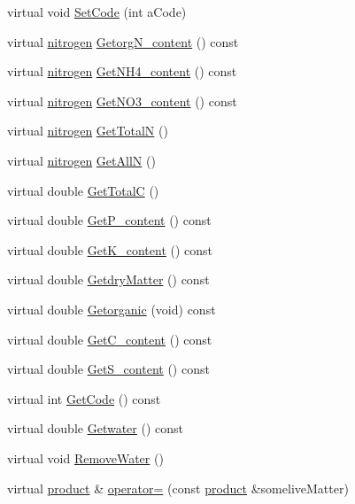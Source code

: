 \begin{DoxyCompactItemize}
\item 
virtual void \hyperlink{classlive_matter_adccc136d61343a2fa73a7ed5aafbed3e}{SetCode} (int aCode)
\item 
virtual \hyperlink{classnitrogen}{nitrogen} \hyperlink{classlive_matter_ac4b95fdff5ad224d9aa1541589c64663}{GetorgN\_\-content} () const 
\item 
virtual \hyperlink{classnitrogen}{nitrogen} \hyperlink{classlive_matter_a461f95ec9e31447ffee31066ea357ab1}{GetNH4\_\-content} () const 
\item 
virtual \hyperlink{classnitrogen}{nitrogen} \hyperlink{classlive_matter_ab2a2d0d05066ad642643b8835016010e}{GetNO3\_\-content} () const 
\item 
virtual \hyperlink{classnitrogen}{nitrogen} \hyperlink{classlive_matter_a1688ff189b2809aeefd3b25b74f8446d}{GetTotalN} ()
\item 
virtual \hyperlink{classnitrogen}{nitrogen} \hyperlink{classlive_matter_ac2063bf6ed8da618b7b2b2b47defaa12}{GetAllN} ()
\item 
virtual double \hyperlink{classlive_matter_a62259dba6b54a8d4d8684cbe9bf312ce}{GetTotalC} ()
\item 
virtual double \hyperlink{classlive_matter_aed9acd0807e62d97e092ea6c2aaa966f}{GetP\_\-content} () const 
\item 
virtual double \hyperlink{classlive_matter_accdc895062d3dbebf1277b565b1b72d3}{GetK\_\-content} () const 
\item 
virtual double \hyperlink{classlive_matter_ad3d05f1e8ceedc99e214adca94638de0}{GetdryMatter} () const 
\item 
virtual double \hyperlink{classlive_matter_a7b016854c1d3b40807216315b031263a}{Getorganic} (void) const 
\item 
virtual double \hyperlink{classlive_matter_a899102ff3dccbfdc70b79e701c135514}{GetC\_\-content} () const 
\item 
virtual double \hyperlink{classlive_matter_a1006a296abc6361ae90010ff27ff8281}{GetS\_\-content} () const 
\item 
virtual int \hyperlink{classlive_matter_afd7dcfed0138fc12d81d29aa586c5c73}{GetCode} () const 
\item 
virtual double \hyperlink{classlive_matter_a6a4839f1bc9ee6db69b25a7a66151f26}{Getwater} () const 
\item 
virtual void \hyperlink{classlive_matter_ad058ede27a28aa89754500d5ccbbdd8a}{RemoveWater} ()
\item 
virtual \hyperlink{classproduct}{product} \& \hyperlink{classlive_matter_a3b1eb79d0f248a4459874db44c335cac}{operator=} (const \hyperlink{classproduct}{product} \&someliveMatter)

\end{DoxyCompactItemize}

